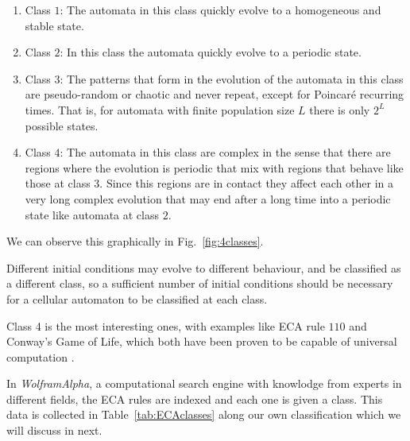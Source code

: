 \begin{enumerate}
    \item Class $1$: The automata in this class quickly evolve to a homogeneous and stable state.
    \item Class $2$: In this class the automata quickly evolve to a periodic state.
    \item Class $3$: The patterns that form in the evolution of the automata in this class are pseudo-random or chaotic and never repeat, except for Poincaré recurring times. That is, for automata with finite population size $L$ there is only $2^L$ possible states.
    \item Class $4$: The automata in this class are complex in the sense that there are regions where the evolution is periodic that mix with regions that behave like those at class $3$. Since this regions are in contact they affect each other in a very long complex evolution that may end after a long time into a periodic state like automata at class $2$. 
\end{enumerate}




We can observe this graphically in Fig.~\ref{fig:4classes}.

Different initial conditions may evolve to different behaviour, and be classified as a different class, so a sufficient number of initial conditions should be necessary for a cellular automaton to be classified at each class.

Class 4 is the most interesting ones, with examples like ECA rule $110$ and Conway's Game of Life, which both have been proven to be capable of universal computation \cite{UniversalComputingECA110}. 


In \textit{WolframAlpha}, a computational search engine with knowlodge from experts in different fields, the ECA rules are indexed and each one is given a class. This data is collected in Table~\ref{tab:ECAclasses} along our own classification which we will discuss in next.














